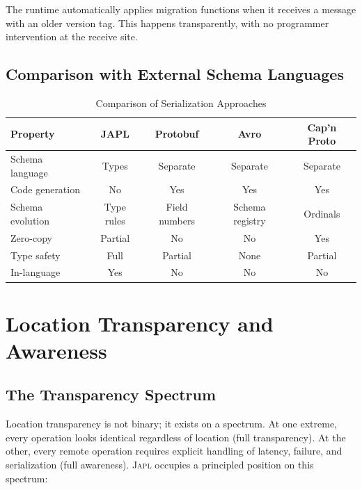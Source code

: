 \documentclass[11pt,a4paper]{article}
\newcommand{\japl}{\textsc{Japl}}
\begin{document}
The runtime automatically applies migration functions when it receives a
message with an older version tag. This happens transparently, with no
programmer intervention at the receive site.

\subsection{Comparison with External Schema Languages}

\begin{table}[H]
\centering
\caption{Comparison of Serialization Approaches}
\label{tab:serialization}
\begin{tabularx}{\textwidth}{lcccc}
\toprule
\textbf{Property} & \textbf{JAPL} & \textbf{Protobuf} & \textbf{Avro} & \textbf{Cap'n Proto} \\
\midrule
Schema language       & Types & Separate & Separate & Separate \\
Code generation       & No    & Yes      & Yes      & Yes \\
Schema evolution      & Type rules & Field numbers & Schema registry & Ordinals \\
Zero-copy             & Partial & No & No & Yes \\
Type safety           & Full  & Partial  & None     & Partial \\
In-language           & Yes   & No       & No       & No \\
\bottomrule
\end{tabularx}
\end{table}


\section{Location Transparency and Awareness}
\label{sec:location-transparency}

\subsection{The Transparency Spectrum}

Location transparency is not binary; it exists on a spectrum. At one
extreme, every operation looks identical regardless of location (full
transparency). At the other, every remote operation requires explicit
handling of latency, failure, and serialization (full awareness). \japl{}
occupies a principled position on this spectrum:
\end{document}
